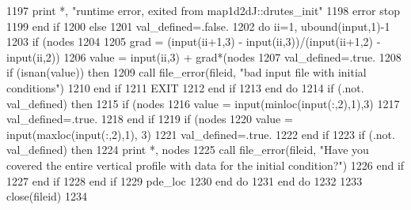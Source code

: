 \begin{DoxyCode}
1197                 print *, \textcolor{stringliteral}{"runtime error, exited from map1d2dJ::drutes\_init"}
1198                 error stop
1199 \textcolor{keywordflow}{              end if}             
1200             \textcolor{keywordflow}{else}
1201               val\_defined=.false.
1202               \textcolor{keywordflow}{do} ii=1, ubound(input,1)-1
1203                 \textcolor{keywordflow}{if} (nodes%
1204                   
1205                   grad = (input(ii+1,3) - input(ii,3))/(input(ii+1,2) - input\textcolor{comment}{(ii,2))}
1206 \textcolor{comment}{                  }\textcolor{keywordtype}{value} =  input(ii,3) + grad*(nodes%
1207 \textcolor{comment}{                  val\_defined=.true.}
1208 \textcolor{comment}{                  }\textcolor{keywordflow}{if} (isnan(\textcolor{keywordtype}{value})) \textcolor{keywordflow}{then}
1209                     \textcolor{keyword}{call }file_error(fileid, \textcolor{stringliteral}{"bad input file with initial conditions"}\textcolor{comment}{)}
1210 \textcolor{comment}{}\textcolor{keywordflow}{                  end if}
1211                   \textcolor{keywordflow}{EXIT}
1212 \textcolor{keywordflow}{                end if}
1213 \textcolor{keywordflow}{              end do}
1214               \textcolor{keywordflow}{if} (.not. val\_defined) \textcolor{keywordflow}{then}
1215                 \textcolor{keywordflow}{if} (nodes%
1216                   \textcolor{keywordtype}{value} = input(minloc(input(:,2),1),3)
1217                   val\_defined=.true.
1218 \textcolor{keywordflow}{                end if}
1219                 \textcolor{keywordflow}{if} (nodes%
1220                   \textcolor{keywordtype}{value} = input(maxloc(input(:,2),1), 3)
1221                   val\_defined=.true.
1222 \textcolor{keywordflow}{                end if}
1223                 \textcolor{keywordflow}{if} (.not. val\_defined) \textcolor{keywordflow}{then}
1224                   print *, nodes%
1225                   \textcolor{keyword}{call }file_error(fileid, \textcolor{stringliteral}{"Have you covered the entire vertical profile with data for the
       initial condition?"}\textcolor{comment}{)}
1226 \textcolor{comment}{}\textcolor{keywordflow}{                end if}
1227 \textcolor{keywordflow}{              end if}
1228 \textcolor{keywordflow}{            end if}
1229             pde\_loc%
1230 \textcolor{keywordflow}{        end do}
1231 \textcolor{keywordflow}{      end do}
1232         
1233       \textcolor{keyword}{close}(fileid)
1234       
\end{DoxyCode}


